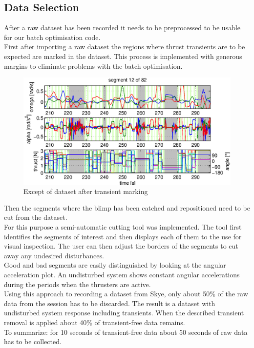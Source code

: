 \subsection{Data Selection}
\label{sub:data_selection}
After a raw dataset has been recorded it needs to be preprocessed to be usable for our batch optimisation code.\\
First after importing a raw dataset the regions where thrust transients are to be expected are marked in the dataset.
This process is implemented with generous margins to eliminate problems with the batch optimisation. \\
\begin{figure}[htbp]
\centering
\includegraphics[scale=0.8]{images/interactive_cut/interactive_cut_long_modified.eps}
\caption{Except of dataset after transient marking}
\end{figure}
Then the segments where the blimp has been catched and repositioned need to be cut from the dataset. \\
For this purpose a semi-automatic cutting tool was implemented. 
The tool first identifies the segments of interest and then displays each of them to the use for visual inspection.
The user can then adjust the borders of the segments to cut away any undesired disturbances. \\
Good and bad segments are easily distinguished by looking at the angular acceleration plot.
An undisturbed system shows constant angular accelerations during the periods when the thrusters are active. \\
Using this approach to recording a dataset from Skye, only about 50\% of the raw data from the session has to be discarded.
The result is a dataset with undisturbed system response including transients.
When the described transient removal is applied about 40\% of transient-free data remains.\\
To summarize: for 10 seconds of transient-free data about 50 seconds of raw data has to be collected.

